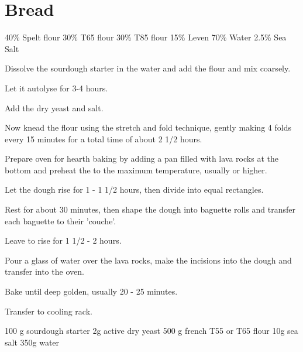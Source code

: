 \chapter{Bread}
\minitoc

\label{rec:spelt-loaf}

\begin{ingreds}
	40\% Spelt flour
	30\% T65 flour
	30\% T85 flour
	15\% Leven
	70\% Water
	2.5\% Sea Salt

\end{ingreds}

\begin{method}		
     	Dissolve the sourdough starter in the water and add the flour and mix coarsely.

	Let it autolyse for 3-4 hours.

	Add the dry yeast and salt.

	Now knead the flour using the stretch and fold technique, gently making 4 folds  every 15 minutes for a total time of about 2 1/2 hours.

	Prepare oven for hearth baking by adding a pan filled with lava rocks at the bottom and preheat the to the maximum temperature, usually  or higher.

	Let the dough rise for 1 - 1 1/2 hours, then divide into equal rectangles.

	Rest for about 30 minutes, then shape the dough into baguette rolls and transfer each baguette to their 'couche'.

	Leave to rise for 1 1/2 - 2 hours.

	Pour a glass of water over the lava rocks, make the incisions into the dough and transfer into the oven.

	Bake until deep golden,  usually 20 - 25 minutes.

	Transfer to cooling rack.

\end {method}


\label{rec:bread-baguette}

\begin{ingreds}
	100 g sourdough starter
	2g active dry yeast
	500 g french T55 or T65 flour
	10g sea salt
	350g water

\end{ingreds}

